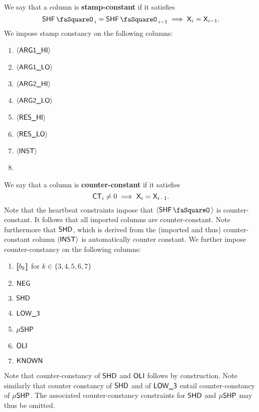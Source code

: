 We say that a column  is \textbf{stamp-constant} if it satisfies
\[
	\shfStamp_{i} = \shfStamp_{i-1} \implies \col{X}_{i} = \col{X}_{i - 1}.
\]
We impose stamp constancy on the following columns:
\begin{multicols}{4}
\begin{enumerate}
	\item $\langle{}\textsf{ARG}\textsf{1}\textsf{\_HI}\rangle{}$
	\item $\langle{}\textsf{ARG}\textsf{1}\textsf{\_LO}\rangle{}$
	\item $\langle{}\textsf{ARG}\textsf{2}\textsf{\_HI}\rangle{}$
	\item $\langle{}\textsf{ARG}\textsf{2}\textsf{\_LO}\rangle{}$
	\item $\langle{}\textsf{RES}\textsf{\_HI}\rangle{}$
	\item $\langle{}\textsf{RES}\textsf{\_LO}\rangle{}$
	\item $\langle{}\textsf{INST}\rangle{}$
	\item[\vspace{\fill}]
\end{enumerate}
\end{multicols}
\noindent We say that a column  is \textbf{counter-constant} if it satisfies
\[
	\textsf{CT}_{i} \neq 0 \implies \textsf{X}_{i} = \textsf{X}_{i - 1}.
\]
Note that the heartbeat constraints impose that $\iShfStamp$ is counter-constant. It follows that all imported columns are counter-constant. Note furthermore that $\textsf{SHD}$, which is derived from the (imported and thus) counter-constant column $\langle{}\textsf{INST}\rangle{}$ is automatically counter constant. We further impose counter-constancy on the following columns:
\begin{multicols}{3}
\begin{enumerate}
	\item $[\![b_{k}]\!]$ for $k \in \{3, 4, 5, 6, 7\}$
	\item $\textsf{NEG}$
	\item $\textsf{SHD}$
	\item $\textsf{LOW\_3}$
	\item $\textsf{$\mu$SHP}$
	\item $\textsf{OLI}$
	\item $\textsf{KNOWN}$
\end{enumerate}
\end{multicols}
Note that counter-constancy of $\textsf{SHD}$ and $\textsf{OLI}$ follows by construction. Note similarly that counter constancy of $\textsf{SHD}$ and of $\textsf{LOW\_3}$ entail counter-constancy of $\textsf{$\mu$SHP}$. The associated counter-constancy constraints for $\textsf{SHD}$ and $\textsf{$\mu$SHP}$ may thus be omitted.